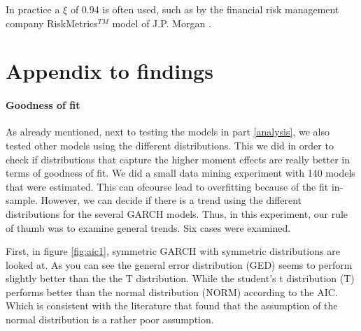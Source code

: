 \documentclass[a4paper, nobind]{templates/ociamthesis}
\begin{document}
In practice a \(\xi\) of 0.94 is often used, such as by the financial risk management company RiskMetrics\(^{TM}\) model of J.P. Morgan \autocite{morganguarantytrustcompany1996}.

\newpage

\hypertarget{appendix-to-findings}{%
\chapter{Appendix to findings}\label{appendix-to-findings}}

\hypertarget{goodness-of-fit}{%
\subsubsection{Goodness of fit}\label{goodness-of-fit}}

\noindent As already mentioned, next to testing the models in part \ref{analysis}, we also tested other models using the different distributions. This we did in order to check if distributions that capture the higher moment effects are really better in terms of goodness of fit. We did a small data mining experiment with 140 models that were estimated. This can ofcourse lead to overfitting because of the fit in-sample. However, we can decide if there is a trend using the different distributions for the several GARCH models. Thus, in this experiment, our rule of thumb was to examine general trends. Six cases were examined. ~\\

\newpage

First, in figure \ref{fig:aic1}, symmetric GARCH with symmetric distributions are looked at. As you can see the general error distribution (GED) seems to perform slightly better than the the T distribution. While the student's t distribution (T) performs better than the normal distribution (NORM) according to the AIC. Which is consistent with the literature that found that the assumption of the normal distribution is a rather poor assumption.
\end{document}
